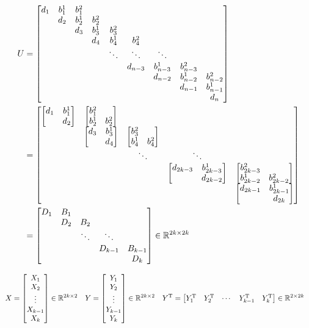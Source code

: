 \documentclass[11pt]{article}
\newcommand{\T}{\mathrm{T}}
\begin{document}
\begin{align*}
    U &= \mqty[
        d_{1} & b^{1}_{1} & b^{2}_{1} &   &   &   &   &   &  \\
          & d_{2} & b^{1}_{2} & b^{2}_{2} &   &   &   &   &  \\
          &   & d_{3} & b^{1}_{3} & b^{2}_{3} &   &   &   &  \\
          &   &   & d_{4} & b^{1}_{4} & b^{2}_{4} &   &   &  \\
          &   &   &   & \ddots & \ddots & \ddots &   &  \\
          &   &   &   &   & d_{n-3} & b^{1}_{n-3} & b^{2}_{n-3} &  \\
          &   &   &   &   &   & d_{n-2} & b^{1}_{n-2} & b^{2}_{n-2}\\
          &   &   &   &   &   &   & d_{n-1} & b^{1}_{n-1}\\
          &   &   &   &   &   &   &   & d_{n}
    ]\\
    &= \mqty[
        \mqty[d_{1} & b^{1}_{1} \\ & d_{2}] & \mqty[b^{2}_{1} &  \\ b^{1}_{2} & b^{2}_{2}] &   &   &  \\
          & \mqty[d_{3} & b^{1}_{3} \\ & d_{4}] & \mqty[b^{2}_{3} & \\ b^{1}_{4} & b^{2}_{4}] &   &  \\
          &   & \ddots & \ddots &  \\
          &   &   & \mqty[d_{2k-3} & b^{1}_{2k-3} \\ & d_{2k-2}] & \mqty[b^{2}_{2k-3} & \\ b^{1}_{2k-2} & b^{2}_{2k-2}] \\
          &   &   &   & \mqty[d_{2k-1} & b^{1}_{2k-1}\\ & d_{2k}]
    ]\\
    &= \mqty[
        D_{1} & B_{1} &   &   &  \\
          & D_{2} & B_{2} &   &  \\
          &   & \ddots & \ddots &  \\
          &   &   & D_{k-1} & B_{k-1}\\
          &   &   &   & D_{k}
    ] \in \mathbb{R}^{2k \times 2k}
\end{align*}

\begin{align*}
    X &= \mqty[
        X_{1} \\
        X_{2} \\
        \vdots \\
        X_{k-1} \\
        X_{k}
        ]
    \in \mathbb{R}^{2k \times 2}
    &
    Y &= \mqty[
        Y_{1} \\
        Y_{2} \\
        \vdots \\
        Y_{k-1} \\
        Y_{k}
        ]
    \in \mathbb{R}^{2k \times 2}
    &
    Y^{\T} &= \mqty[
        Y_{1}^{\T} & Y_{2}^{\T} & \cdots & Y_{k-1}^{\T} & Y_{k}^{\T}
        ] \in \mathbb{R}^{2 \times 2k}
\end{align*}
\end{document}
